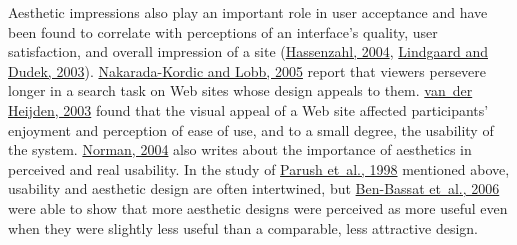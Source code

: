 \documentclass[sigconf,nonacm,screen,pbalance]{acmart}
\begin{document}
Aesthetic impressions also play an important role in user acceptance and have been found to correlate with
perceptions of an interface's quality, user satisfaction, and overall impression of a site (\href{https://searchuserinterfaces.com/book/sui_references.html#hassenzahl2004ibg}{Hassenzahl, 2004}, \href{https://searchuserinterfaces.com/book/sui_references.html#lindgaard2003ebw}{ Lindgaard and Dudek, 2003}). \href{https://searchuserinterfaces.com/book/sui_references.html#nakaradakordic2005epa}{Nakarada-Kordic and Lobb, 2005} report that viewers persevere longer in a search task on Web sites
whose design appeals to them. \href{https://searchuserinterfaces.com/book/sui_references.html#vanderheijden2003fiu}{van~der Heijden, 2003} found that the
visual appeal of a Web site affected participants' enjoyment and perception of ease of use, and to a small
degree, the usability of the system. \href{https://searchuserinterfaces.com/book/sui_references.html#norman2004edw}{Norman, 2004} also writes about the importance of aesthetics in perceived and real usability. In
the study of \href{https://searchuserinterfaces.com/book/sui_references.html#parush10elg}{Parush et~al., 1998} mentioned above, usability and aesthetic design are often intertwined, but \href{https://searchuserinterfaces.com/book/sui_references.html#benbassat2006eas}{Ben-Bassat et~al., 2006} were able to show that more aesthetic designs were perceived
as more useful even when they were slightly less useful than a comparable, less attractive design.
\end{document}
